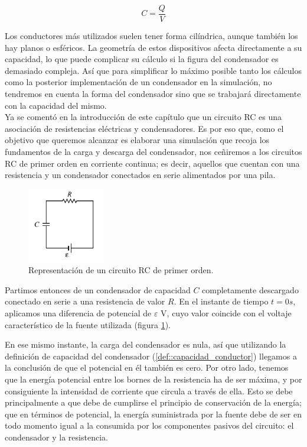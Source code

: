 \documentclass[../main.tex]{subfiles}
\begin{document}
\begin{equation}
    \label{def::capacidad_conductor}
    C = \frac{Q}{V}
\end{equation}

Los conductores más utilizados suelen tener forma cilíndrica, aunque también los hay planos o esféricos. La geometría de estos dispositivos afecta directamente a su capacidad, lo que puede complicar su cálculo si la figura del condensador es demasiado compleja. Así que para simplificar lo máximo posible tanto los cálculos como la posterior implementación de un condensador en la simulación, no tendremos en cuenta la forma del condensador sino que se trabajará directamente con la capacidad del mismo.\\ 

Ya se comentó en la introducción de este capítulo que un circuito RC es una asociación de resistencias eléctricas y condensadores. Es por eso que, como el objetivo que queremos alcanzar es elaborar una simulación que recoja los fundamentos de la carga y descarga del condensador, nos ceñiremos a los circuitos RC de primer orden en corriente continua; es decir, aquellos que cuentan con una resistencia y un condensador conectados en serie alimentados por una pila.\\ 

\begin{figure}[!h]
    \centering
    \includegraphics[width=0.3\textwidth]{images/Circuito_RC.png}
    \caption{Representación de un circuito RC de primer orden.}
    \label{fig::circuito_rc_representación}
\end{figure}

Partimos entonces de un condensador de capacidad $C$ completamente descargado conectado en serie a una resistencia de valor $R$. En el instante de tiempo $t=0s$, aplicamos una diferencia de potencial de $\varepsilon$ V, cuyo valor coincide con el voltaje característico de la fuente utilizada (figura \ref{fig::circuito_rc_representación}).


En ese mismo instante, la carga del condensador es nula, así que utilizando la definición de capacidad del condensador (\ref{def::capacidad_conductor}) llegamos a la conclusión de que el potencial en él también es cero. Por otro lado, tenemos que la energía potencial entre los bornes de la resistencia ha de ser máxima, y por consiguiente la intensidad de corriente que circula a través de ella. Esto se debe principalmente a que debe de cumplirse el principio de conservación de la energía; que en términos de potencial, la energía suministrada por la fuente debe de ser en todo momento igual a la consumida por los componentes pasivos del circuito: el condensador y la resistencia. 
\end{document}
